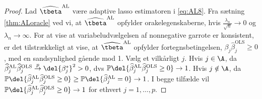 \begin{proof}
Lad \(\widehat{\tbeta}^\text{AL}\) være adaptive lasso estimatoren i \eqref{eq:AL8}.
Fra sætning \ref{thm:ALoracle} ved vi, at \(\widehat{\tbeta}^\text{AL}\) opfylder orakelegenskaberne, hvis \(\frac{\lambda_n}{\sqrt{n}} \rightarrow 0\) og \(\lambda_n \rightarrow \infty\).
For at vise at variabeludvælgelsen af nonnegative garrote er konsistent, er det tilstrækkeligt at vise, at \(\widehat{\tbeta}^\text{AL}\) opfylder fortegnsbetingelsen, \(\beta_j \widehat{\beta}_j^\text{OLS} \geq 0 \), med en sandsynlighed gående mod 1.
Vælg et vilkårligt \(j\).
Hvis \(j \in \A\), da \(\widehat{\beta}_j^\text{AL} \widehat{\beta}_j^\text{OLS} \overset{p}{\rightarrow} \del{\beta_j^*}^2 > 0\), dvs \(\mathbb{P} \del{\widehat{\beta}_j^\text{AL} \widehat{\beta}_j^\text{OLS} \geq 0} \rightarrow 1\).
Hvis \(j \notin \A\), da \(\mathbb{P} \del{\widehat{\beta}_j^\text{AL} \widehat{\beta}_j^\text{OLS} \geq 0} \geq \mathbb{P} \del{\widehat{\beta}_j^\text{AL} = 0} \rightarrow 1\).
I begge tilfælde vil \(\mathbb{P} \del{\widehat{\beta}_j^\text{AL} \widehat{\beta}_j^\text{OLS} \geq 0} \rightarrow 1\) for ethvert \(j = 1, \ldots, p\).
\end{proof}